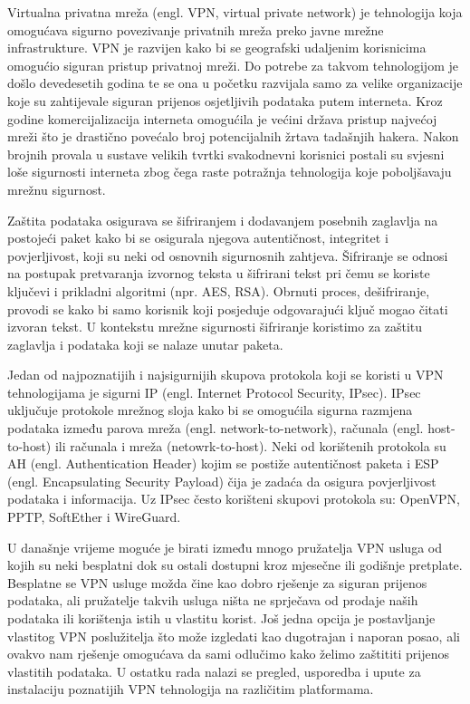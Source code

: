 \hspace{0.5cm}
Virtualna privatna mreža (engl. VPN, virtual private network) je tehnologija koja omogućava sigurno povezivanje privatnih mreža preko javne mrežne infrastrukture. VPN je razvijen kako bi se geografski udaljenim korisnicima omogućio siguran pristup privatnoj mreži.\cite{cis} Do potrebe za takvom tehnologijom je došlo devedesetih godina te se ona u početku razvijala samo za velike organizacije koje su zahtijevale siguran prijenos osjetljivih podataka putem interneta. Kroz godine komercijalizacija interneta omogućila je većini država pristup najvećoj mreži što je drastično povećalo broj potencijalnih žrtava tadašnjih hakera. Nakon brojnih provala u sustave velikih tvrtki svakodnevni korisnici postali su svjesni loše sigurnosti interneta zbog čega raste potražnja tehnologija koje poboljšavaju mrežnu sigurnost.
 \bigbreak
	
Zaštita podataka osigurava se šifriranjem i dodavanjem posebnih zaglavlja na postojeći paket kako bi se osigurala njegova  autentičnost, integritet i povjerljivost, koji su neki od osnovnih sigurnosnih zahtjeva. Šifriranje se odnosi na  postupak pretvaranja izvornog teksta u šifrirani tekst pri čemu se koriste ključevi i prikladni algoritmi (npr. AES, RSA). Obrnuti proces, dešifriranje, provodi se kako bi samo korisnik koji posjeduje odgovarajući ključ mogao čitati izvoran tekst. U kontekstu mrežne sigurnosti šifriranje koristimo za zaštitu zaglavlja i podataka koji se nalaze unutar paketa.\cite{fundamentals} 
\bigbreak

Jedan od najpoznatijih i najsigurnijih skupova protokola koji se koristi u VPN tehnologijama je sigurni IP (engl. Internet Protocol Security, IPsec). IPsec uključuje protokole mrežnog sloja kako bi se omogućila sigurna razmjena podataka između parova mreža (engl. network-to-network), računala (engl. host-to-host) ili računala i mreža (netowrk-to-host). Neki od korištenih protokola su AH (engl. Authentication Header) kojim se postiže autentičnost paketa i ESP (engl. Encapsulating Security Payload) čija je zadaća da osigura povjerljivost podataka i informacija. Uz IPsec često korišteni skupovi protokola su: OpenVPN, PPTP, SoftEther i WireGuard. 
\bigbreak
 
U današnje vrijeme moguće je birati između mnogo pružatelja VPN usluga od kojih su neki besplatni dok su ostali dostupni kroz mjesečne ili godišnje pretplate. Besplatne se VPN usluge možda čine kao dobro rješenje za siguran prijenos podataka, ali pružatelje takvih usluga ništa ne sprječava od prodaje naših podataka ili korištenja istih u vlastitu korist. Još jedna opcija je postavljanje vlastitog VPN poslužitelja što može izgledati kao dugotrajan i naporan posao, ali ovakvo nam rješenje omogućava da sami odlučimo kako želimo zaštititi prijenos vlastitih podataka. U ostatku rada nalazi se pregled, usporedba i upute za instalaciju poznatijih VPN tehnologija na različitim platformama.

